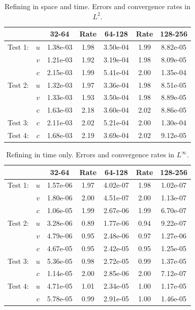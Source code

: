 \documentclass[final]{siamltex}
\begin{document}
\begin{table}[h]
\begin{center}
\caption{Refining in space and time.  Errors and convergence rates in $L^2$.}
\begin{tabular}{ccccccc}
& & 32-64 & Rate & 64-128 & Rate & 128-256 \\
\hline
Test 1:             & $u$ & 1.38e-03 & 1.98 & 3.50e-04 & 1.99 & 8.82e-05 \\
                    & $v$ & 1.21e-03 & 1.92 & 3.19e-04 & 1.98 & 8.09e-05 \\
                    & $c$ & 2.15e-03 & 1.99 & 5.41e-04 & 2.00 & 1.35e-04 \\
\hline
Test 2:             & $u$ & 1.32e-03 & 1.97 & 3.36e-04 & 1.98 & 8.51e-05 \\
                    & $v$ & 1.33e-03 & 1.93 & 3.50e-04 & 1.98 & 8.89e-05 \\
                    & $c$ & 1.63e-03 & 2.18 & 3.60e-04 & 2.02 & 8.86e-05 \\
\hline
Test 3:             & $c$ & 2.11e-03 & 2.02 & 5.21e-04 & 2.00 & 1.30e-04 \\
\hline
Test 4:             & $c$ & 1.68e-03 & 2.19 & 3.69e-04 & 2.02 & 9.12e-05
\end{tabular}
\end{center}
\end{table}

\begin{table}[h]
\begin{center}
\caption{Refining in time only.  Errors and convergence rates in $L^\infty$.}
\begin{tabular}{ccccccc}
& & 32-64 & Rate & 64-128 & Rate & 128-256 \\
\hline
Test 1:             & $u$ & 1.57e-06 & 1.97 & 4.02e-07 & 1.98 & 1.02e-07 \\
                    & $v$ & 1.80e-06 & 2.00 & 4.51e-07 & 2.00 & 1.13e-07 \\
                    & $c$ & 1.06e-05 & 1.99 & 2.67e-06 & 1.99 & 6.70e-07 \\
\hline
Test 2:             & $u$ & 3.28e-06 & 0.89 & 1.77e-06 & 0.94 & 9.22e-07 \\
                    & $v$ & 4.79e-06 & 0.95 & 2.48e-06 & 0.97 & 1.27e-06 \\
                    & $c$ & 4.67e-05 & 0.95 & 2.42e-05 & 0.95 & 1.25e-05 \\
\hline
Test 3:             & $u$ & 5.36e-05 & 0.98 & 2.72e-05 & 0.99 & 1.37e-05 \\
                    & $c$ & 1.14e-05 & 2.00 & 2.85e-06 & 2.00 & 7.12e-07 \\
\hline
Test 4:             & $u$ & 4.71e-05 & 1.01 & 2.34e-05 & 1.00 & 1.17e-05 \\
                    & $c$ & 5.78e-05 & 0.99 & 2.91e-05 & 1.00 & 1.46e-05
\end{tabular}
\end{center}
\end{table}
\end{document}
